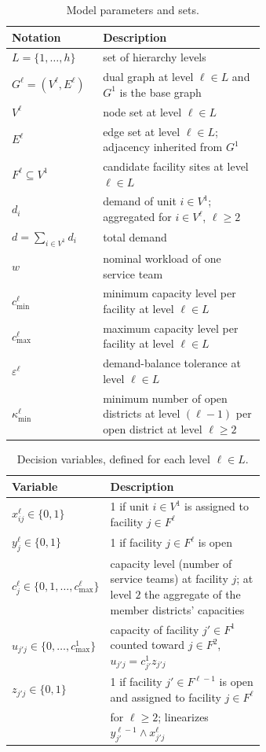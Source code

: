 
\begin{table}[ht]
\centering
\caption{Model parameters and sets.}
\label{tab:parameters}
\begin{tabular}{@{}lp{0.64\linewidth}@{}}
\toprule
Notation & Description \\
\midrule
$L = \{1, \ldots, h\}$ & set of hierarchy levels \\
$G^\ell = (V^\ell, E^\ell)$ & dual graph at level $\ell \in L$ and $G^1$ is the base graph \\
$V^\ell$ & node set at level $\ell \in L$ \\
$E^\ell$ & edge set at level $\ell \in L$; adjacency inherited from $G^1$ \\
$F^\ell \subseteq V^1$ & candidate facility sites at level $\ell \in L$ \\
$d_i$ & demand of unit $i \in V^1$; aggregated for $i \in V^\ell$, $\ell \geq 2$ \\
$d = \sum_{i \in V^1} d_i$ & total demand \\
$w$ & nominal workload of one service team \\
$c^{\ell}_{\min}$ & minimum capacity level per facility at level $\ell \in L$ \\
$c^{\ell}_{\max}$ & maximum capacity level per facility at level $\ell \in L$ \\
$\varepsilon^\ell$ & demand-balance tolerance at level $\ell \in L$ \\
$\kappa^\ell_{\min}$ & minimum number of open districts at level $(\ell-1)$ per open district at level $\ell \geq 2$ \\
\bottomrule
\end{tabular}
\end{table}

\begin{table}[ht]
\centering
\caption{Decision variables, defined for each level $\ell \in L$.}
\label{tab:variables}
\begin{tabular}{@{}lp{0.64\linewidth}@{}}
\toprule
Variable & Description \\
\midrule
$x_{ij}^\ell \in \{0,1\}$ & 1 if unit $i \in V^1$ is assigned to facility $j \in F^\ell$ \\
$y_j^\ell \in \{0,1\}$ & 1 if facility $j \in F^\ell$ is open \\
$c^\ell_j \in \{0, 1, \ldots, c^\ell_{\max}\}$ & capacity level (number of service teams) at facility $j$; at level $2$ the aggregate of the member districts' capacities \\
$u_{j'j} \in \{0, \ldots, c^1_{\max}\}$ & capacity of facility $j' \in F^1$ counted toward $j \in F^2$, $u_{j'j} = c^1_{j'} z_{j'j}$ \\
$z_{j'j} \in \{0,1\}$ & 1 if facility $j' \in F^{\ell-1}$ is open and assigned to facility $j \in F^\ell$ \\
&
for $\ell \geq 2$; linearizes $y^{\ell-1}_{j'} \wedge x^\ell_{j'j}$ \\
\bottomrule
\end{tabular}
\end{table}
